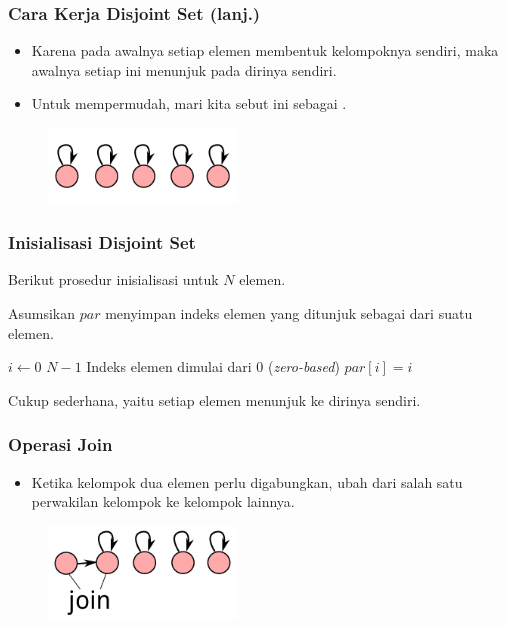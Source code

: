 \begin{frame}
\frametitle{Cara Kerja Disjoint Set (lanj.)}
\begin{itemize}
  \item Karena pada awalnya setiap elemen membentuk kelompoknya sendiri, maka awalnya setiap  ini menunjuk pada dirinya sendiri.
  \item Untuk mempermudah, mari kita sebut  ini sebagai .
\end{itemize}
\begin{figure}
  \includegraphics[width=5cm]{asset/djs-init.pdf}
\end{figure}
\end{frame}

\begin{frame}
\frametitle{Inisialisasi Disjoint Set}
Berikut prosedur inisialisasi \pdjs untuk $N$ elemen. \newline

Asumsikan \farray $par$ menyimpan indeks elemen yang ditunjuk sebagai  dari suatu elemen.
\begin{codebox}
\li \For $i \gets 0$ \To $N-1$ \Comment Indeks elemen dimulai dari 0 (\textit{zero-based})
\li \Do   $par[i] = i$ 
    \End
\end{codebox}

Cukup sederhana, yaitu setiap elemen menunjuk ke dirinya sendiri.
\end{frame}

\begin{frame}
\frametitle{Operasi Join}
\begin{itemize}
  \item Ketika kelompok dua elemen perlu digabungkan, ubah  dari salah satu perwakilan kelompok ke kelompok lainnya.
\end{itemize}
\begin{figure}
  \includegraphics[width=5cm]{asset/djs-join-1.pdf}
\end{figure}
\end{frame}

